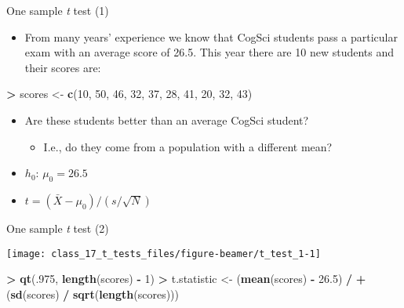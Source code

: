\documentclass[
  ignorenonframetext,
]{beamer}
\newenvironment{Shaded}{\begin{snugshade}}{\end{snugshade}}
\newcommand{\DecValTok}[1]{\textcolor[rgb]{0.00,0.00,0.81}{#1}}
\newcommand{\FloatTok}[1]{\textcolor[rgb]{0.00,0.00,0.81}{#1}}
\newcommand{\FunctionTok}[1]{\textcolor[rgb]{0.13,0.29,0.53}{\textbf{#1}}}
\newcommand{\NormalTok}[1]{#1}
\newcommand{\OtherTok}[1]{\textcolor[rgb]{0.56,0.35,0.01}{#1}}
\newcommand{\SpecialCharTok}[1]{\textcolor[rgb]{0.81,0.36,0.00}{\textbf{#1}}}
\providecommand{\tightlist}{%
  \setlength{\itemsep}{0pt}\setlength{\parskip}{0pt}}
\begin{document}
\begin{frame}[fragile]{One sample \emph{t} test (1)}
\label{one-sample-t-test-1}
\begin{itemize}
\tightlist
\item
  From many years' experience we know that CogSci students pass a
  particular exam with an average score of 26.5. This year there are 10
  new students and their scores are:
\end{itemize}

\begin{Shaded}
\begin{Highlighting}[]
\SpecialCharTok{\textgreater{}}\NormalTok{ scores }\OtherTok{\textless{}{-}} \FunctionTok{c}\NormalTok{(}\DecValTok{10}\NormalTok{, }\DecValTok{50}\NormalTok{, }\DecValTok{46}\NormalTok{, }\DecValTok{32}\NormalTok{, }\DecValTok{37}\NormalTok{, }\DecValTok{28}\NormalTok{, }\DecValTok{41}\NormalTok{, }\DecValTok{20}\NormalTok{, }\DecValTok{32}\NormalTok{, }\DecValTok{43}\NormalTok{)}
\end{Highlighting}
\end{Shaded}

\begin{itemize}
\tightlist
\item
  Are these students better than an average CogSci student?

  \begin{itemize}
  \tightlist
  \item
    I.e., do they come from a population with a different mean?
  \end{itemize}
\item
  \(h_0\): \(\mu_0 = 26.5\)
\item
  \(t = (\bar{X} - \mu_0) / (s / \sqrt{N})\)
\end{itemize}
\end{frame}

\begin{frame}[fragile]{One sample \emph{t} test (2)}
\label{one-sample-t-test-2}
\begin{center}\texttt{[image: class\_17\_t\_tests\_files/figure-beamer/t\_test\_1-1]} \end{center}

\begin{Shaded}
\begin{Highlighting}[]
\SpecialCharTok{\textgreater{}} \FunctionTok{qt}\NormalTok{(.}\DecValTok{975}\NormalTok{, }\FunctionTok{length}\NormalTok{(scores) }\SpecialCharTok{{-}} \DecValTok{1}\NormalTok{)}
\SpecialCharTok{\textgreater{}}\NormalTok{ t.statistic }\OtherTok{\textless{}{-}}\NormalTok{ (}\FunctionTok{mean}\NormalTok{(scores) }\SpecialCharTok{{-}} \FloatTok{26.5}\NormalTok{) }\SpecialCharTok{/}
\SpecialCharTok{+}\NormalTok{      (}\FunctionTok{sd}\NormalTok{(scores) }\SpecialCharTok{/} \FunctionTok{sqrt}\NormalTok{(}\FunctionTok{length}\NormalTok{(scores)))}
\end{Highlighting}
\end{Shaded}
\end{frame}
\end{document}
